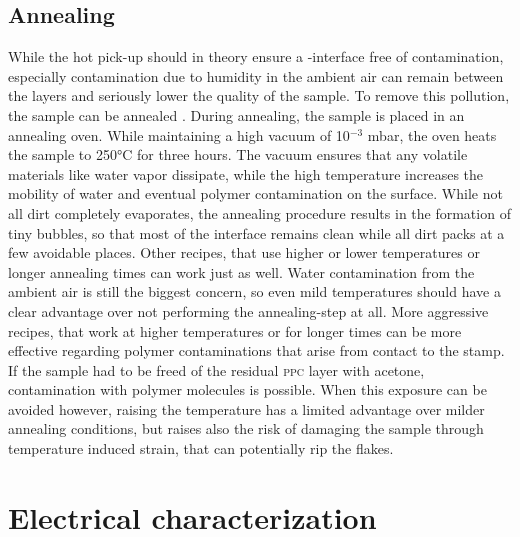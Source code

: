 \subsection{Annealing}

While the hot pick-up should in theory ensure a \hbn-\tmdg interface free of contamination, especially contamination due to humidity in the ambient air can remain between the layers and seriously lower the quality of the sample. To remove this pollution, the sample can be annealed \cite{lin_graphene_2012}. During annealing, the sample is placed in an annealing oven. While maintaining a high vacuum of 10$^{-3}$ mbar, the oven heats the sample to 250°C for three hours. The vacuum ensures that any volatile materials like water vapor dissipate, while the high temperature increases the mobility of water and eventual polymer contamination on the surface. While not all dirt completely evaporates, the annealing procedure results in the formation of tiny bubbles, so that most of the interface remains clean while all dirt packs at a few avoidable places. Other recipes, that use higher or lower temperatures or longer annealing times can work just as well. Water contamination from the ambient air is still the biggest concern, so even mild temperatures should have a clear advantage over not performing the annealing-step at all. 
More aggressive recipes, that work at higher temperatures or for longer times can be more effective regarding polymer contaminations that arise from contact to the stamp. If the sample had to be freed of the residual \textsc{ppc} layer with acetone, contamination with polymer molecules is possible. When this exposure can be avoided however, raising the temperature has a limited advantage over milder annealing conditions, but raises also the risk of damaging the sample through temperature induced strain, that can potentially rip the \tmdg flakes. 

\section{Electrical characterization}

